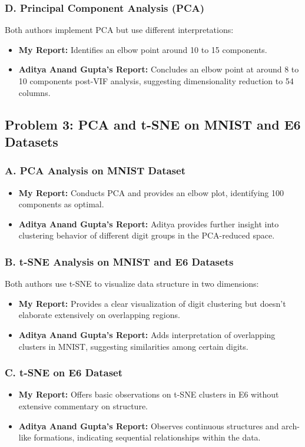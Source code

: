\subsubsection*{D. Principal Component Analysis (PCA)}
Both authors implement PCA but use different interpretations:
\begin{itemize}
    \item \textbf{My Report:} Identifies an elbow point around 10 to 15 components.
    \item \textbf{Aditya Anand Gupta's Report:} Concludes an elbow point at around 8 to 10 components post-VIF analysis, suggesting dimensionality reduction to 54 columns.
\end{itemize}

\subsection*{Problem 3: PCA and t-SNE on MNIST and E6 Datasets}

\subsubsection*{A. PCA Analysis on MNIST Dataset}
\begin{itemize}
    \item \textbf{My Report:} Conducts PCA and provides an elbow plot, identifying 100 components as optimal.
    \item \textbf{Aditya Anand Gupta's Report:} Aditya provides further insight into clustering behavior of different digit groups in the PCA-reduced space.
\end{itemize}

\subsubsection*{B. t-SNE Analysis on MNIST and E6 Datasets}
Both authors use t-SNE to visualize data structure in two dimensions:
\begin{itemize}
    \item \textbf{My Report:} Provides a clear visualization of digit clustering but doesn’t elaborate extensively on overlapping regions.
    \item \textbf{Aditya Anand Gupta's Report:} Adds interpretation of overlapping clusters in MNIST, suggesting similarities among certain digits.
\end{itemize}

\subsubsection*{C. t-SNE on E6 Dataset}
\begin{itemize}
    \item \textbf{My Report:} Offers basic observations on t-SNE clusters in E6 without extensive commentary on structure.
    \item \textbf{Aditya Anand Gupta's Report:} Observes continuous structures and arch-like formations, indicating sequential relationships within the data.
\end{itemize}

